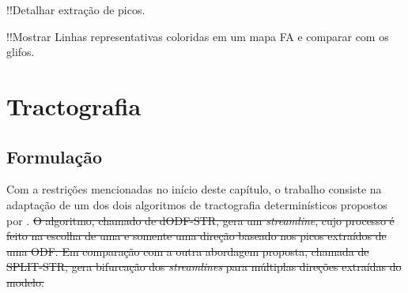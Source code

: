\documentclass[
    12pt,                %
    oneside,            %
    a4paper,            %
    english,            %
    french,                %
    spanish,            %
    brazil                %
    ]{abntex2}
\begin{document}






!!Detalhar extração de picos.

!!Mostrar Linhas representativas coloridas em um mapa FA e comparar com os glifos.

\section{Tractografia}

\subsection{Formulação}

Com a restrições mencionadas no início deste capítulo, o trabalho consiste na adaptação de um dos dois algoritmos de tractografia determinísticos propostos por . \sout{O algoritmo, chamado de dODF-STR, gera um \textit{streamline}, cujo processo é feito na escolha de uma e somente uma direção baseado nos picos extraídos de uma ODF. Em comparação com a outra abordagem proposta, chamada de SPLIT-STR, gera bifurcação dos \textit{streamlines} para múltiplas direções extraídas do modelo.}
\end{document}
